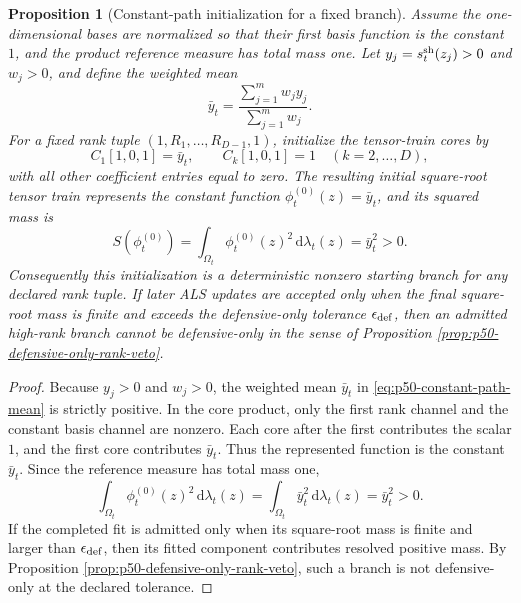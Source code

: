 \documentclass[11pt]{article}
\newtheorem{proposition}{Proposition}
\numberwithin{equation}{section}
\newcommand{\dd}{\,\mathrm d}
\begin{document}
\begin{proposition}[Constant-path initialization for a fixed branch]
\label{prop:p50-constant-path-initialization}
Assume the one-dimensional bases are normalized so that their first basis
function is the constant \(1\), and the product reference measure has total
mass one.  Let \(y_j=s_t^{\rm sh}(z_j)>0\) and \(w_j>0\), and define the
weighted mean
\begin{equation}
    \bar y_t=
    \frac{\sum_{j=1}^{m}w_jy_j}{\sum_{j=1}^{m}w_j}.
    \label{eq:p50-constant-path-mean}
\end{equation}
For a fixed rank tuple \((1,R_1,\ldots,R_{D-1},1)\), initialize the tensor-train
cores by
\begin{equation}
    C_{1}[1,0,1]=\bar y_t,\qquad
    C_{k}[1,0,1]=1\quad (k=2,\ldots,D),
    \label{eq:p50-constant-path-init}
\end{equation}
with all other coefficient entries equal to zero.  The resulting initial
square-root tensor train represents the constant function
\(\phi_t^{(0)}(z)=\bar y_t\), and its squared mass is
\begin{equation}
    S(\phi_t^{(0)})=
    \int_{\Omega_t}\phi_t^{(0)}(z)^2\dd\lambda_t(z)
    =
    \bar y_t^2>0.
    \label{eq:p50-constant-path-mass}
\end{equation}
Consequently this initialization is a deterministic nonzero starting branch for
any declared rank tuple.  If later ALS updates are accepted only when the final
square-root mass is finite and exceeds the defensive-only tolerance
\(\epsilon_{\rm def}\), then an admitted high-rank branch cannot be
defensive-only in the sense of Proposition
\ref{prop:p50-defensive-only-rank-veto}.
\end{proposition}

\begin{proof}
Because \(y_j>0\) and \(w_j>0\), the weighted mean
\(\bar y_t\) in \eqref{eq:p50-constant-path-mean} is strictly positive.  In
the core product, only the first rank channel and the constant basis channel
are nonzero.  Each core after the first contributes the scalar \(1\), and the
first core contributes \(\bar y_t\).  Thus the represented function is the
constant \(\bar y_t\).  Since the reference measure has total mass one,
\[
    \int_{\Omega_t}\phi_t^{(0)}(z)^2\dd\lambda_t(z)
    =
    \int_{\Omega_t}\bar y_t^2\dd\lambda_t(z)
    =
    \bar y_t^2>0.
\]
If the completed fit is admitted only when its square-root mass is finite and
larger than \(\epsilon_{\rm def}\), then its fitted component contributes
resolved positive mass.  By Proposition
\ref{prop:p50-defensive-only-rank-veto}, such a branch is not defensive-only at
the declared tolerance.
\end{proof}
\end{document}
